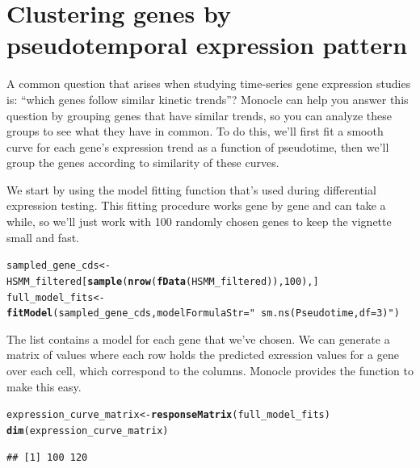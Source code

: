 \documentclass[10pt,oneside]{article}\usepackage[]{graphicx}\usepackage[]{color}
\makeatletter
\newcommand{\hlnum}[1]{\textcolor[rgb]{0.686,0.059,0.569}{#1}}%
\newcommand{\hlstr}[1]{\textcolor[rgb]{0.192,0.494,0.8}{#1}}%
\newcommand{\hlstd}[1]{\textcolor[rgb]{0.345,0.345,0.345}{#1}}%
\newcommand{\hlkwb}[1]{\textcolor[rgb]{0.69,0.353,0.396}{#1}}%
\newcommand{\hlkwc}[1]{\textcolor[rgb]{0.333,0.667,0.333}{#1}}%
\newcommand{\hlkwd}[1]{\textcolor[rgb]{0.737,0.353,0.396}{\textbf{#1}}}%
\newenvironment{kframe}{%
 \def\at@end@of@kframe{}%
 \ifinner\ifhmode%
  \def\at@end@of@kframe{\end{minipage}}%
  \begin{minipage}{\columnwidth}%
 \fi\fi%
 \def\FrameCommand##1{\hskip\@totalleftmargin \hskip-\fboxsep
 \colorbox{shadecolor}{##1}\hskip-\fboxsep
     \hskip-\linewidth \hskip-\@totalleftmargin \hskip\columnwidth}%
 \MakeFramed {\advance\hsize-\width
   \@totalleftmargin\z@ \linewidth\hsize
   \@setminipage}}%
 {\par\unskip\endMakeFramed%
 \at@end@of@kframe}
\newenvironment{knitrout}{}{} %
\makeatother
\begin{document}
\section{Clustering genes by pseudotemporal expression pattern}

A common question that arises when studying time-series gene expression studies is: ``which genes follow similar kinetic trends''?  Monocle can help you answer this question by grouping genes that have similar trends, so you can analyze these groups to see what they have in common.  To do this, we'll first fit a smooth curve for each gene's expression trend as a function of pseudotime, then we'll group the genes according to similarity of these curves. 

We start by using the model fitting function that's used during differential expression testing.  This fitting procedure works gene by gene and can take a while, so we'll just work with 100 randomly chosen genes to keep the vignette small and fast.

\begin{knitrout}
\color{fgcolor}\begin{kframe}
\begin{alltt}
\hlstd{sampled_gene_cds} \hlkwb{<-} \hlstd{HSMM_filtered[}\hlkwd{sample}\hlstd{(}\hlkwd{nrow}\hlstd{(}\hlkwd{fData}\hlstd{(HSMM_filtered)),} \hlnum{100}\hlstd{),]}
\hlstd{full_model_fits} \hlkwb{<-} \hlkwd{fitModel}\hlstd{(sampled_gene_cds,}  \hlkwc{modelFormulaStr}\hlstd{=}\hlstr{"~sm.ns(Pseudotime, df=3)"}\hlstd{)}
\end{alltt}
\end{kframe}
\end{knitrout}

The  list contains a model for each gene that we've chosen.  We can generate a matrix of values where each row holds the predicted exression values for a gene over each cell, which correspond to the columns. Monocle provides the  function to make this easy.

\begin{knitrout}
\color{fgcolor}\begin{kframe}
\begin{alltt}
\hlstd{expression_curve_matrix} \hlkwb{<-} \hlkwd{responseMatrix}\hlstd{(full_model_fits)}
\hlkwd{dim}\hlstd{(expression_curve_matrix)}
\end{alltt}
\begin{verbatim}
## [1] 100 120
\end{verbatim}
\end{kframe}
\end{knitrout}
\end{document}
